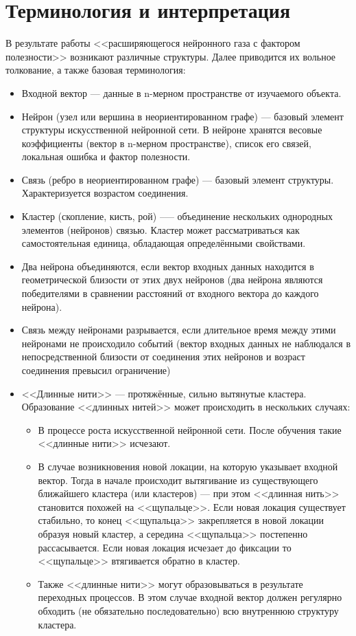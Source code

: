 \documentclass[unicode, 12pt, a4paper,oneside,fleqn]{article}
\begin{document}
\section{Терминология и интерпретация}
В результате работы <<расширяющегося нейронного газа с фактором
полезности>> возникают различные структуры. Далее приводится их
вольное толкование, а также базовая терминология:

\begin{itemize}
\item Входной вектор --- данные в n-мерном пространстве от изучаемого
  объекта.
\item Нейрон (узел или вершина в неориентированном графе) --- базовый
  элемент структуры искусственной нейронной сети. В нейроне хранятся
  весовые коэффициенты (вектор в n-мерном пространстве), список его
  связей, локальная ошибка и фактор полезности.
\item Связь (ребро в неориентированном графе) --- базовый элемент
  структуры. Характеризуется возрастом соединения.
\item Кластер (скопление, кисть, рой) --— объединение нескольких
  однородных элементов (нейронов) связью. Кластер может рассматриваться как
  самостоятельная единица, обладающая определёнными свойствами.
\item Два нейрона объединяются, если вектор входных данных находится в
  геометрической близости от этих двух нейронов (два нейрона являются
  победителями в сравнении расстояний от входного вектора до каждого
  нейрона).
\item Связь между нейронами разрывается, если длительное время между
  этими нейронами не происходило событий (вектор входных данных не
  наблюдался в непосредственной близости от соединения этих нейронов и
  возраст соединения превысил ограничение)
\item <<Длинные нити>> --- протяжённые, сильно вытянутые кластера.
  Образование <<длинных нитей>> может происходить в нескольких случаях:
  \begin{itemize}
  \item В процессе роста искусственной нейронной сети. После обучения
    такие <<длинные нити>> исчезают.
  \item В случае возникновения новой локации, на которую указывает
    входной вектор. Тогда в начале происходит вытягивание из
    существующего ближайшего кластера (или кластеров) --- при этом
    <<длинная нить>> становится похожей на <<щупальце>>. Если новая
    локация существует стабильно, то конец <<щупальца>> закрепляется в
    новой локации образуя новый кластер, а середина <<щупальца>>
    постепенно рассасывается. Если новая локация исчезает до фиксации
    то <<щупальце>> втягивается обратно в кластер.
  \item Также <<длинные нити>> могут образовываться в результате
    переходных процессов. В этом случае входной вектор должен
    регулярно обходить (не обязательно последовательно) всю внутреннюю
    структуру кластера.
  \end{itemize}
\end{itemize}
\end{document}
